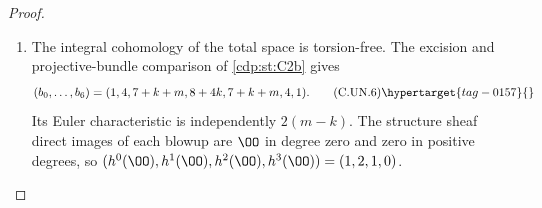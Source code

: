 \begin{proof}
\begin{enumerate}[label=\arabic*.,leftmargin=*]
\item The integral cohomology of the total space is torsion-free. The
excision and projective-bundle comparison of \ref{cdp:st:C2b} gives
\[
 (b_0,\ldots,b_6)
      =(1,4,7+k+m,8+4k,7+k+m,4,1).                  \tag{C.UN.6}\hypertarget{tag-0157}{}\label{cdp:eq:C.UN.6}
\]
Its Euler characteristic is independently $2(m-k)$. The structure
sheaf direct images of each blowup are $\OO$ in degree zero and
zero in positive degrees, so
$(h^0(\OO),h^1(\OO),h^2(\OO),h^3(\OO))=(1,2,1,0)$.


\end{enumerate}
\end{proof}